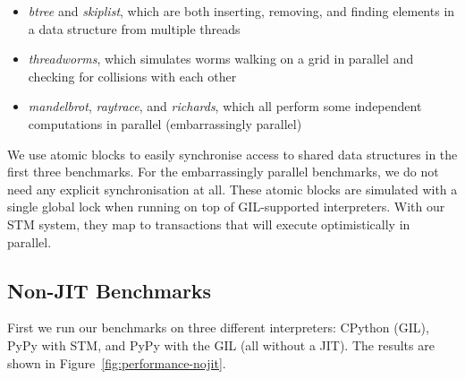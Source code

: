 \documentclass{sigplanconf}
\begin{document}
\begin{itemize}
\item \emph{btree} and \emph{skiplist}, which are both inserting,
  removing, and finding elements in a data structure from multiple
  threads
\item \emph{threadworms}, which simulates worms walking on a grid in
  parallel and checking for collisions with each other
\item \emph{mandelbrot}, \emph{raytrace}, and \emph{richards}, which
  all perform some independent computations in parallel (embarrassingly
  parallel)
\end{itemize}

We use atomic blocks to easily synchronise access to shared
data structures in the first three benchmarks. For the embarrassingly
parallel benchmarks, we do not need any explicit synchronisation at
all. These atomic blocks are simulated with a single global lock
when running on top of GIL-supported interpreters. With our STM
system, they map to transactions that will execute optimistically
in parallel.









\subsection{Non-JIT Benchmarks}
First we run our benchmarks on three different interpreters: CPython
(GIL), PyPy with STM, and PyPy with the GIL (all without a JIT). The
results are shown in Figure~\ref{fig:performance-nojit}.
\end{document}
